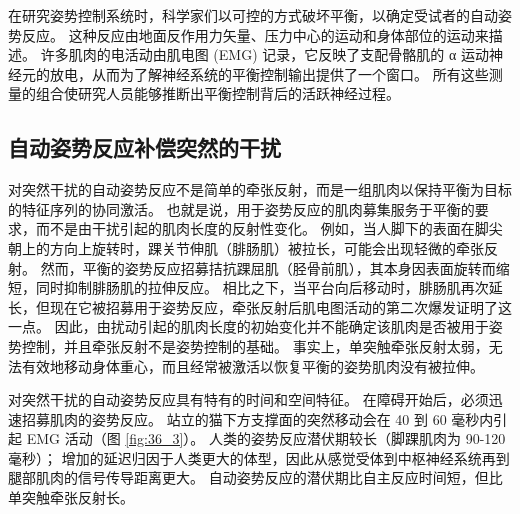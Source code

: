 在研究姿势控制系统时，科学家们以可控的方式破坏平衡，以确定受试者的自动姿势反应。 这种反应由地面反作用力矢量、压力中心的运动和身体部位的运动来描述。 许多肌肉的电活动由肌电图 (EMG) 记录，它反映了支配骨骼肌的 α 运动神经元的放电，从而为了解神经系统的平衡控制输出提供了一个窗口。 所有这些测量的组合使研究人员能够推断出平衡控制背后的活跃神经过程。

\subsection{自动姿势反应补偿突然的干扰}
对突然干扰的自动姿势反应不是简单的牵张反射，而是一组肌肉以保持平衡为目标的特征序列的协同激活。 也就是说，用于姿势反应的肌肉募集服务于平衡的要求，而不是由干扰引起的肌肉长度的反射性变化。 例如，当人脚下的表面在脚尖朝上的方向上旋转时，踝关节伸肌（腓肠肌）被拉长，可能会出现轻微的牵张反射。 然而，平衡的姿势反应招募拮抗踝屈肌（胫骨前肌），其本身因表面旋转而缩短，同时抑制腓肠肌的拉伸反应。 相比之下，当平台向后移动时，腓肠肌再次延长，但现在它被招募用于姿势反应，牵张反射后肌电图活动的第二次爆发证明了这一点。 因此，由扰动引起的肌肉长度的初始变化并不能确定该肌肉是否被用于姿势控制，并且牵张反射不是姿势控制的基础。 事实上，单突触牵张反射太弱，无法有效地移动身体重心，而且经常被激活以恢复平衡的姿势肌肉没有被拉伸。

对突然干扰的自动姿势反应具有特有的时间和空间特征。 在障碍开始后，必须迅速招募肌肉的姿势反应。 
站立的猫下方支撑面的突然移动会在 40 到 60 毫秒内引起 EMG 活动（图 \ref{fig:36_3}）。 
人类的姿势反应潜伏期较长（脚踝肌肉为 90-120 毫秒）； 增加的延迟归因于人类更大的体型，因此从感觉受体到中枢神经系统再到腿部肌肉的信号传导距离更大。 自动姿势反应的潜伏期比自主反应时间短，但比单突触牵张反射长。

